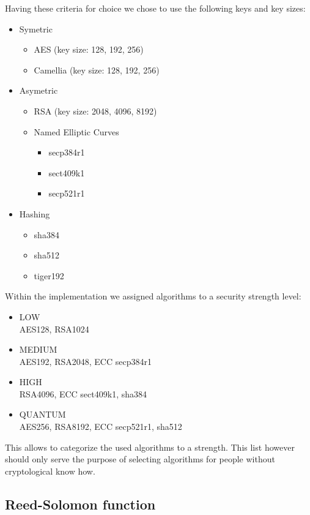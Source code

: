 Having these criteria for choice we chose to use the following keys and key sizes:
\begin{itemize}
	\item Symetric
	\begin{itemize}
		\item AES (key size: 128, 192, 256)
		\item Camellia (key size: 128, 192, 256)
	\end{itemize}
	\item Asymetric
	\begin{itemize}
		\item RSA (key size: 2048, 4096, 8192)
		\item Named Elliptic Curves
		\begin{itemize}
			\item secp384r1
			\item sect409k1
			\item secp521r1
		\end{itemize}
	\end{itemize}
	\item Hashing
	\begin{itemize}
		\item sha384
		\item sha512
		\item tiger192
	\end{itemize}
\end{itemize}

Within the implementation we assigned algorithms to a security strength level:
\begin{itemize}
	\item LOW\\
	      AES128, RSA1024
	\item MEDIUM\\
	      AES192, RSA2048, ECC secp384r1
	\item HIGH\\
		  RSA4096, ECC sect409k1, sha384
	\item QUANTUM\\
	      AES256, RSA8192, ECC secp521r1, sha512
\end{itemize}

This allows to categorize the used algorithms to a strength. This list however should only serve the purpose of selecting algorithms for people without cryptological know how.


\subsection{Reed-Solomon function}

